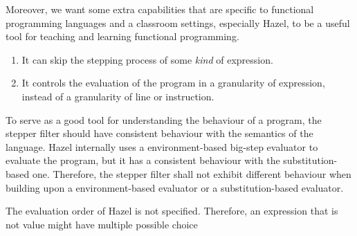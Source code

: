 Moreover, we want some extra capabilities that are specific to functional
programming languages and a classroom settings, especially Hazel, to be a
useful tool for teaching and learning functional programming.
\begin{enumerate}
  \item It can skip the stepping process of some \emph{kind} of expression.
  \item It controls the evaluation of the program in a granularity of
  expression, instead of a granularity of line or instruction.
\end{enumerate}

To serve as a good tool for understanding the behaviour of a program, the stepper
filter should have consistent behaviour with the semantics of the language. Hazel
internally uses a environment-based big-step evaluator to evaluate the program,
but it has a consistent behaviour with the substitution-based one. Therefore,
the stepper filter shall not exhibit different behaviour when building upon a
environment-based evaluator or a substitution-based evaluator.

The evaluation order of Hazel is not specified. Therefore, an expression that is
not value might have multiple possible choice 
